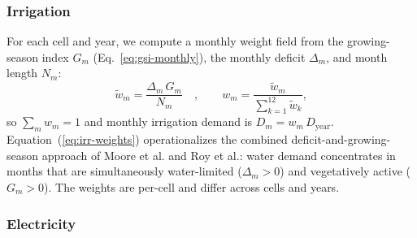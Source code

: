 \documentclass[fleqn,10pt]{wlscirep}
\begin{document}
\subsubsection*{Irrigation}

For each cell and year, we compute a monthly weight field from the growing-season index $G_m$ (Eq.~\ref{eq:gsi-monthly}), the monthly deficit $\Delta_m$, and month length $N_m$:
\begin{equation}
\tilde{w}_m = \frac{\Delta_m \, G_m}{N_m}\quad, \qquad w_m = \frac{\tilde{w}_m}{\sum_{k=1}^{12}\tilde{w}_k},
\label{eq:irr-weights}
\end{equation}
so $\sum_m w_m = 1$ and monthly irrigation demand is $D_m = w_m \, D_{\mathrm{year}}$. Equation~(\ref{eq:irr-weights}) operationalizes the combined deficit-and-growing-season approach of Moore et al.\cite{Moore_2015} and Roy et al.\cite{Roy_2005}: water demand concentrates in months that are simultaneously water-limited ($\Delta_m > 0$) and vegetatively active ($G_m > 0$). The weights are per-cell and differ across cells and years.

\subsubsection*{Electricity}
\end{document}
